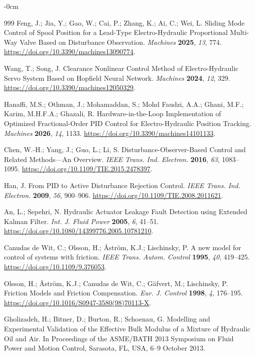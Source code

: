 \documentclass[machines,article,submit,pdftex,moreauthors]{Definitions/mdpi}
\begin{document}
\begin{adjustwidth}{-\extralength}{0cm}
\begin{thebibliography}{999}
 Feng, J.; Jia, Y.; Gao, W.; Cai, P.; Zhang, K.; Ai, C.; Wei, L. Sliding Mode Control of Spool Position for a Lead-Type Electro-Hydraulic Proportional Multi-Way Valve Based on Disturbance Observation. \emph{Machines} \textbf{2025}, \emph{13}, 774. \url{https://doi.org/10.3390/machines13090774}.



 Wang, T.; Song, J. Clearance Nonlinear Control Method of Electro-Hydraulic Servo System Based on Hopfield Neural Network. \emph{Machines} \textbf{2024}, \emph{12}, 329. \url{https://doi.org/10.3390/machines12050329}.



 Hanaffi, M.S.; Othman, J.; Mohamaddan, S.; Mohd Faudzi, A.A.; Ghani, M.F.; Karim, M.H.F.A.; Ghazali, R. Hardware-in-the-Loop Implementation of Optimized Fractional-Order PID Control for Electro-Hydraulic Position Tracking. \emph{Machines} \textbf{2026}, \emph{14}, 1133. \url{https://doi.org/10.3390/machines14101133}.


 Chen, W.-H.; Yang, J.; Guo, L.; Li, S. Disturbance-Observer-Based Control and Related Methods---An Overview. \emph{IEEE Trans. Ind. Electron.} \textbf{2016}, \emph{63}, 1083--1095. \url{https://doi.org/10.1109/TIE.2015.2478397}.


 Han, J. From PID to Active Disturbance Rejection Control. \emph{IEEE Trans. Ind. Electron.} \textbf{2009}, \emph{56}, 900--906. \url{https://doi.org/10.1109/TIE.2008.2011621}.


 An, L.; Sepehri, N. Hydraulic Actuator Leakage Fault Detection using Extended Kalman Filter. \emph{Int. J. Fluid Power} \textbf{2005}, \emph{6}, 41--51. \url{https://doi.org/10.1080/14399776.2005.10781210}.


 Canudas de Wit, C.; Olsson, H.; \AA{}str\"om, K.J.; Lischinsky, P. A new model for control of systems with friction. \emph{IEEE Trans. Autom. Control} \textbf{1995}, \emph{40}, 419--425. \url{https://doi.org/10.1109/9.376053}.


 Olsson, H.; \AA{}str\"om, K.J.; Canudas de Wit, C.; G\"afvert, M.; Lischinsky, P. Friction Models and Friction Compensation. \emph{Eur. J. Control} \textbf{1998}, \emph{4}, 176--195. \url{https://doi.org/10.1016/S0947-3580(98)70113-X}.


 Gholizadeh, H.; Bitner, D.; Burton, R.; Schoenau, G. Modelling and Experimental Validation of the Effective Bulk Modulus of a Mixture of Hydraulic Oil and Air. In Proceedings of the ASME/BATH 2013 Symposium on Fluid Power and Motion Control, Sarasota, FL, USA, 6--9 October 2013.


\end{thebibliography}
\end{adjustwidth}
\end{document}
